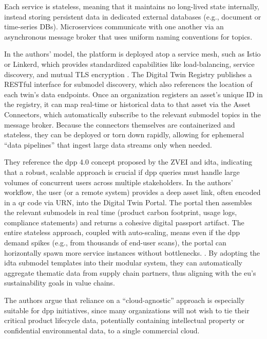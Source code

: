 Each service is stateless, meaning that it maintains no long-lived state internally, instead storing persistent data in dedicated external databases (e.g., document or time-series DBs). Microservices communicate with one another via an asynchronous message broker that uses uniform naming conventions for topics. \autocite{Redeker.2024}

In the authors’ model, the platform is deployed atop a service mesh, such as Istio or Linkerd, which provides standardized capabilities like load-balancing, service discovery, and mutual TLS encryption \autocite{Barr.2024}. The Digital Twin Registry publishes a RESTful interface for submodel discovery, which also references the location of each twin’s data endpoints. Once an organization registers an asset’s unique ID in the registry, it can map real-time or historical data to that asset via the Asset Connectors, which automatically subscribe to the relevant submodel topics in the message broker. Because the connectors themselves are containerized and stateless, they can be deployed or torn down rapidly, allowing for ephemeral “data pipelines” that ingest large data streams only when needed. \autocite{Redeker.2024}

They reference the \ac{dpp} 4.0 concept proposed by the ZVEI and \ac{idta}, indicating that a robust, scalable approach is crucial if \ac{dpp} queries must handle large volumes of concurrent users across multiple stakeholders. In the authors’ workflow, the user (or a remote system) provides a deep asset link, often encoded in a \ac{qr} code via URN, into the Digital Twin Portal. The portal then assembles the relevant submodels in real time (product carbon footprint, usage logs, compliance statements) and returns a cohesive digital passport artifact. The entire stateless approach, coupled with auto-scaling, means even if the \ac{dpp} demand spikes (e.g., from thousands of end-user scans), the portal can horizontally spawn more service instances without bottlenecks. . By adopting the \ac{idta} submodel templates into their modular system, they can automatically aggregate thematic data from supply chain partners, thus aligning with the \ac{eu}’s sustainability goals in value chains. \autocite{Redeker.2024, Garrels.2023}

The authors argue that reliance on a “cloud-agnostic” approach is especially suitable for \ac{dpp} initiatives, since many organizations will not wish to tie their critical product lifecycle data, potentially containing intellectual property or confidential environmental data, to a single commercial cloud.

